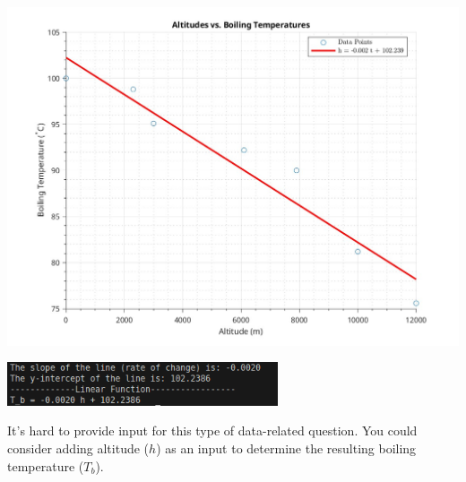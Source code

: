 \documentclass[a4paper, 12pt]{report}
\def\link{blue!50!black}
\begin{document}

\includegraphics[width=1\textwidth]{main/graphs_images/altitudes_vs_boiling_temperatures.jpeg}
\begin{center}
    \includegraphics[width=0.6\textwidth]{main/graphs_images/1screen.png}
\end{center}
It's hard to provide input for this type of data-related question.
You could consider adding altitude (\(h\)) as an input to determine the resulting boiling temperature (\(T_b\)).
 


\newpage
\end{document}
